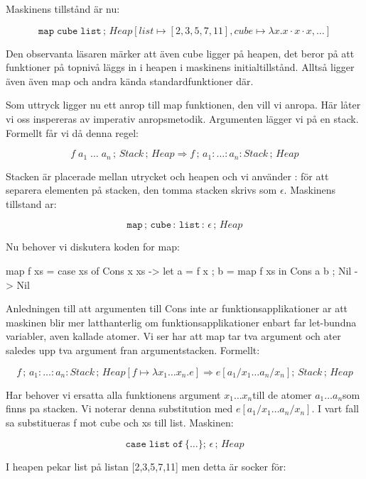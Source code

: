\documentclass[../Core]{subfiles}
\begin{document}
Maskinens tillstånd är nu: 

\[
\mathtt{map\; cube\; list}\,;\, Heap[list\mapsto[2,3,5,7,11],cube\mapsto\lambda x.x\cdot x\cdot x,\ldots]\]


Den observanta läsaren märker att även cube ligger på heapen, det
beror på att funktioner på topnivå läggs in i heapen i maskinens initialtillstånd.
Alltså ligger även även map och andra kända standardfunktioner där. 

Som uttryck ligger nu ett anrop till map funktionen, den vill vi anropa.
Här låter vi oss inspereras av imperativ anropsmetodik. Argumenten
lägger vi på en stack. Formellt får vi då denna regel:

\[
f\; a_{1}\;\ldots\; a_{n}\,;\, Stack\,;\, Heap\Rightarrow f\,;\, a_{1}:\ldots:a_{n}:Stack\,;\, Heap\]


Stacken är placerade mellan utrycket och heapen och vi använder :
för att separera elementen på stacken, den tomma stacken skrivs som
$\epsilon$. Maskinens tillstand ar:

\[
\mathtt{map\,\mathrm{;}\, cube\,:\, list\,:\,\epsilon}\,;\, Heap\]


Nu behover vi diskutera koden for map:


\begin{codeEx}
map f xs = case xs of
    { Cons x xs -> let { a = f x 
                       ; b = map f xs
                       } in Cons a b
    ; Nil       -> Nil
    }
\end{codeEx}

Anledningen till att argumenten till Cons inte ar funktionsapplikationer
ar att maskinen blir mer latthanterlig om funktionsapplikationer enbart
far let-bundna variabler, aven kallade atomer. Vi ser har att map
tar tva argument och ater saledes upp tva argument fran argumentstacken.
Formellt:

\[
f\,;\, a_{1}:\ldots:a_{n}:Stack\,;\, Heap[f\mapsto\lambda x_{1}\ldots x_{n}.e]\Rightarrow e[a{}_{1}/x_{1}\ldots a_{n}/x_{n}];\, Stack\,;\, Heap\]


Har behover vi ersatta alla funktionens argument $x_{1}\ldots x_{n}$till
de atomer $a_{1}\ldots a_{n}$som finns pa stacken. Vi noterar denna
substitution med $e[a{}_{1}/x_{1}\ldots a_{n}/x_{n}]$. I vart fall
sa substitueras f mot cube och xs till list. Maskinen:

\[
\mathtt{case\; list\; of\,\lbrace\ldots\rbrace};\,\epsilon\,;\, Heap\]


I heapen pekar list på listan {[}2,3,5,7,11{]} men detta är socker
för:
\end{document}
